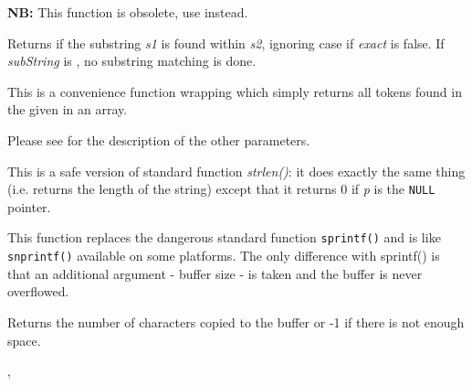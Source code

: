 
{\bf NB:} This function is obsolete, use  instead.

Returns \true if the substring {\it s1} is found within {\it s2},
ignoring case if {\it exact} is false. If {\it subString} is \false,
no substring matching is done.


\label{wxstringtokenize}


This is a convenience function wrapping
 which simply returns all tokens
found in the given  in an array.

Please see
for the description of the other parameters.


\label{wxstrlen}


This is a safe version of standard function {\it strlen()}: it does exactly the
same thing (i.e. returns the length of the string) except that it returns 0 if
{\it p} is the {\tt NULL} pointer.


\label{wxsnprintf}


This function replaces the dangerous standard function {\tt sprintf()} and is
like {\tt snprintf()} available on some platforms. The only difference with
sprintf() is that an additional argument - buffer size - is taken and the
buffer is never overflowed.

Returns the number of characters copied to the buffer or -1 if there is not
enough space.


, 



